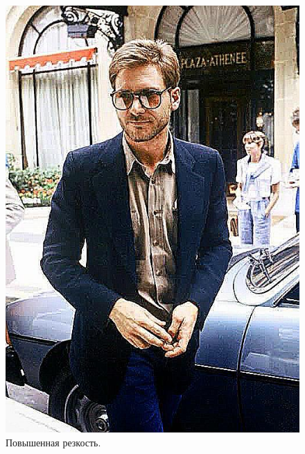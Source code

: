 \documentclass[a4paper,12pt]{article}
\begin{document}
\begin{figure}[h]
\begin{center}
\begin{minipage}[h]{0.3\linewidth}
\includegraphics[width=1\linewidth]{Pic_matrix_Sharpness}
Повышенная резкость. 
\end{minipage}
$\mspace{50mu}$
\begin{minipage}[h]{0.3\linewidth}

\end{minipage}
\end{center}
\end{figure}
\end{document}
